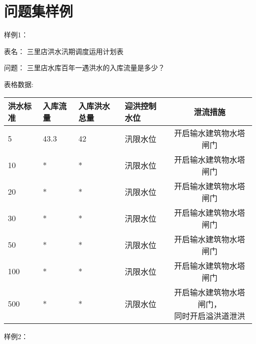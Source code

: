 \chapter{问题集样例}
\label{cha:问题集样例}



样例1：

表名： 
三里店洪水汛期调度运用计划表

问题：
三里店水库百年一遇洪水的入库流量是多少？

表格数据:

\begin{table}[htbp]
    \centering
    \begin{tabular}{llllc}
    \toprule
    \textbf{洪水标准} & \textbf{入库流量} & \textbf{入库洪水总量} & \textbf{迎洪控制水位} & \textbf{泄流措施} \\
    \midrule
    5 & 43.3 & 42 & 汛限水位 & 开启输水建筑物水塔闸门 \\
    10 & * & * & 汛限水位 & 开启输水建筑物水塔闸门 \\
    20 & * & * & 汛限水位 & 开启输水建筑物水塔闸门 \\
    30 & * & * & 汛限水位 & 开启输水建筑物水塔闸门 \\
    50 & * & * & 汛限水位 & 开启输水建筑物水塔闸门 \\
    100 & * & * & 汛限水位 & 开启输水建筑物水塔闸门 \\
    500 & * & * & 汛限水位 & \makecell{开启输水建筑物水塔闸门，\\同时开启溢洪道泄洪} \\
    \bottomrule
    \end{tabular}
\end{table}
\newpage
样例2：

